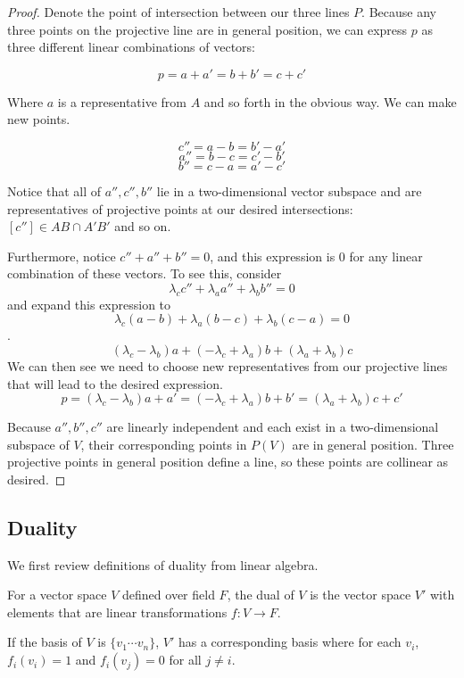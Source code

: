 \documentclass[10pt]{article}
\begin{document}
\begin{proof}
	Denote the point of intersection between our three lines $P$. Because any
	three points on the projective line are in general position, we can express
	$p$ as three different linear combinations of vectors:

	\[ p = a + a' = b + b' = c + c' \]

	Where $a$ is a representative from $A$ and so forth in the obvious way. We
	can make new points.

	\[ c'' = a - b = b' - a' \]
	\[ a'' = b - c = c' - b' \]
	\[ b'' = c - a = a' - c' \]

	Notice that all of $a'', c'', b''$ lie in a two-dimensional vector
	subspace and are representatives of projective points at our desired
	intersections: $[c''] \in AB \cap A'B'$ and so on. 

	Furthermore, notice $c'' + a'' + b'' = 0$, and this expression is $0$ for any
	linear combination of these vectors. To see this, consider 
	\[\lambda_c c'' + \lambda_a a'' + \lambda_b b'' = 0\] 
	and expand this expression to 
	\[\lambda_c (a - b) + \lambda_a (b - c) + \lambda_b (c - a) = 0\].
	\[(\lambda_c - \lambda_b)a + (-\lambda_c + \lambda_a)b + (\lambda_a + \lambda_b)c\] 
	We can then see we need to choose new representatives from our projective
	lines that will lead to the desired expression.
	\[ p = (\lambda_c - \lambda_b)a + a' = (-\lambda_c + \lambda_a)b + b' =(\lambda_a + \lambda_b) c + c' \]

	Because $a'', b'', c''$ are linearly independent and each exist in a
	two-dimensional subspace of $V$, their corresponding points in $P(V)$ are in
	general position. Three projective points in general position define a line,
	so these points are collinear as desired.

\end{proof}

\subsection{Duality}

We first review definitions of duality from linear algebra.

\begin{definition}
For a vector space $V$ defined over field $F$, the dual of $V$ is the vector
space $V'$ with elements that are linear transformations $f: V \to F$.
\end{definition}

\begin{definition}
If the basis of $V$ is $\{ v_1 \cdots v_n \}$, $V'$ has a corresponding basis
where for each $v_i$, $f_i(v_i) = 1$ and $f_i(v_j) = 0$ for all $j \neq i$.
\end{definition}
\end{document}
